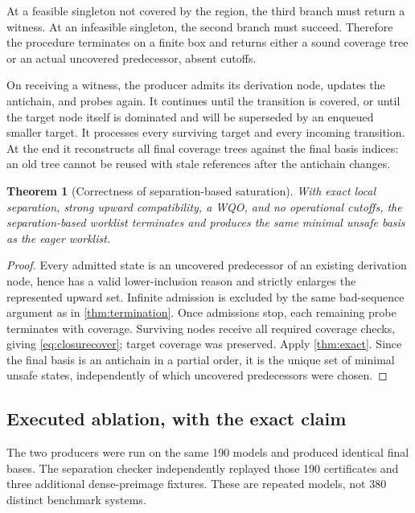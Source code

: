 \documentclass[11pt,a4paper]{article}
\newtheorem{theorem}{Theorem}[section]
\theoremstyle{definition}
\begin{document}
At a feasible singleton not covered by the region, the third branch must
return a witness. At an infeasible singleton, the second branch must succeed.
Therefore the procedure terminates on a finite box and returns either a
sound coverage tree or an actual uncovered predecessor, absent cutoffs.

On receiving a witness, the producer admits its derivation node, updates the
antichain, and probes again. It continues until the transition is covered,
or until the target node itself is dominated and will be superseded by an
enqueued smaller target. It processes every surviving target and every
incoming transition. At the end it reconstructs all final coverage trees
against the final basis indices: an old tree cannot be reused with stale
references after the antichain changes.

\begin{theorem}[Correctness of separation-based saturation]
\label{thm:separation}
With exact local separation, strong upward compatibility, a WQO, and no
operational cutoffs, the separation-based worklist terminates and produces the
same minimal unsafe basis as the eager worklist.
\end{theorem}
\begin{proof}
Every admitted state is an uncovered predecessor of an existing derivation
node, hence has a valid lower-inclusion reason and strictly enlarges the
represented upward set. Infinite admission is excluded by the same bad-sequence
argument as in \cref{thm:termination}. Once admissions stop, each remaining
probe terminates with coverage. Surviving nodes receive all required coverage
checks, giving \eqref{eq:closurecover}; target coverage was preserved.
Apply \cref{thm:exact}. Since the final basis is an antichain in a partial
order, it is the unique set of minimal unsafe states, independently of which
uncovered predecessors were chosen.
\end{proof}

\subsection{Executed ablation, with the exact claim}
The two producers were run on the same 190 models and produced identical
final bases. The separation checker independently replayed those 190
certificates and three additional dense-preimage fixtures. These are repeated
models, not 380 distinct benchmark systems.
\end{document}

